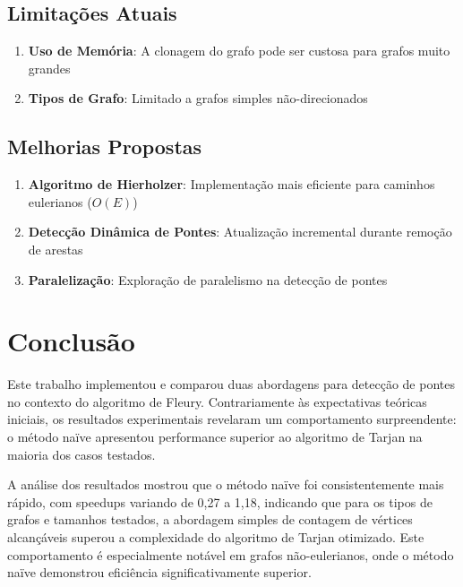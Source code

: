 \documentclass[12pt]{article}
\begin{document}
\subsection{Limitações Atuais}

\begin{enumerate}
\item \textbf{Uso de Memória}: A clonagem do grafo pode ser custosa para grafos muito grandes
\item \textbf{Tipos de Grafo}: Limitado a grafos simples não-direcionados
\end{enumerate}

\subsection{Melhorias Propostas}

\begin{enumerate}
\item \textbf{Algoritmo de Hierholzer}: Implementação mais eficiente para caminhos eulerianos ($O(E)$)
\item \textbf{Detecção Dinâmica de Pontes}: Atualização incremental durante remoção de arestas
\item \textbf{Paralelização}: Exploração de paralelismo na detecção de pontes
\end{enumerate}

\section{Conclusão}

Este trabalho implementou e comparou duas abordagens para detecção de pontes no contexto do algoritmo de Fleury. Contrariamente às expectativas teóricas iniciais, os resultados experimentais revelaram um comportamento surpreendente: o método naïve apresentou performance superior ao algoritmo de Tarjan na maioria dos casos testados.

A análise dos resultados mostrou que o método naïve foi consistentemente mais rápido, com speedups variando de 0,27 a 1,18, indicando que para os tipos de grafos e tamanhos testados, a abordagem simples de contagem de vértices alcançáveis superou a complexidade do algoritmo de Tarjan otimizado. Este comportamento é especialmente notável em grafos não-eulerianos, onde o método naïve demonstrou eficiência significativamente superior.
\end{document}

